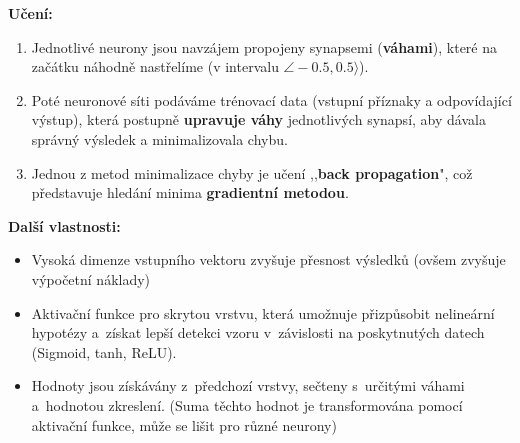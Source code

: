 \textbf{Učení:}
\begin{enumerate}
\item Jednotlivé neurony jsou navzájem propojeny synapsemi (\textbf{váhami}), které na začátku náhodně nastřelíme (v intervalu $\angle -0.5, 0.5 \rangle$).
\item Poté neuronové síti podáváme trénovací data (vstupní příznaky a odpovídající výstup), která postupně \textbf{upravuje váhy} jednotlivých synapsí, aby dávala správný výsledek a minimalizovala chybu.
\item Jednou z metod minimalizace chyby je učení ,,\textbf{back propagation}", což představuje hledání minima \textbf{gradientní metodou}.
\end{enumerate}

\textbf{Další vlastnosti:}
\begin{itemize}
	\item Vysoká dimenze vstupního vektoru zvyšuje přesnost výsledků (ovšem zvyšuje výpočetní náklady)
	\item Aktivační funkce pro skrytou vrstvu, která umožnuje přizpůsobit nelineární hypotézy a~získat lepší detekci vzoru v~závislosti na poskytnutých datech (Sigmoid, tanh, ReLU).
	\item Hodnoty jsou získávány z~předchozí vrstvy, sečteny s~určitými váhami a~hodnotou zkreslení. (Suma těchto hodnot je transformována pomocí aktivační funkce, může se lišit pro různé neurony)
\end{itemize}

\ifnotinclude
